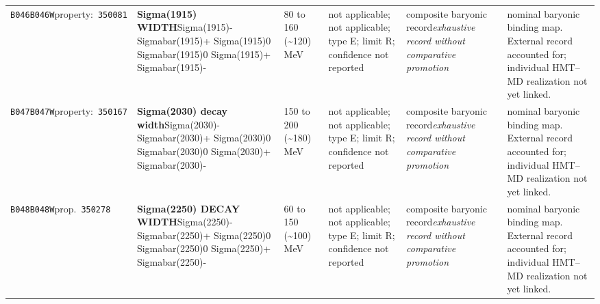 \begin{landscape}
\begin{longtable}{L{1.85cm}L{4.45cm}L{2.35cm}L{4.05cm}L{3.35cm}L{7.15cm}}
\texttt{B046}\newline \texttt{B046W}\newline property:\ \texttt{350081} & \textbf{Sigma(1915) WIDTH}\newline Sigma(1915)- \textbar{}\allowbreak{} Sigmabar(1915)+ \textbar{}\allowbreak{} Sigma(1915)0 \textbar{}\allowbreak{} Sigmabar(1915)0 \textbar{}\allowbreak{} Sigma(1915)+ \textbar{}\allowbreak{} Sigmabar(1915)- & 80 to 160 (\textasciitilde{}120)\,MeV & not applicable; not applicable; type E; limit R; confidence not reported & composite baryonic record\newline \emph{exhaustive record without comparative promotion} & nominal baryonic binding map. External record accounted for; individual HMT--MD realization not yet linked. \\
\texttt{B047}\newline \texttt{B047W}\newline property:\ \texttt{350167} & \textbf{Sigma(2030) decay width}\newline Sigma(2030)- \textbar{}\allowbreak{} Sigmabar(2030)+ \textbar{}\allowbreak{} Sigma(2030)0 \textbar{}\allowbreak{} Sigmabar(2030)0 \textbar{}\allowbreak{} Sigma(2030)+ \textbar{}\allowbreak{} Sigmabar(2030)- & 150 to 200 (\textasciitilde{}180)\,MeV & not applicable; not applicable; type E; limit R; confidence not reported & composite baryonic record\newline \emph{exhaustive record without comparative promotion} & nominal baryonic binding map. External record accounted for; individual HMT--MD realization not yet linked. \\
\texttt{B048}\newline \texttt{B048W}\newline prop.\ \texttt{350278} & \textbf{Sigma(2250) DECAY WIDTH}\newline Sigma(2250)- \textbar{}\allowbreak{} Sigmabar(2250)+ \textbar{}\allowbreak{} Sigma(2250)0 \textbar{}\allowbreak{} Sigmabar(2250)0 \textbar{}\allowbreak{} Sigma(2250)+ \textbar{}\allowbreak{} Sigmabar(2250)- & 60 to 150 (\textasciitilde{}100)\,MeV & not applicable; not applicable; type E; limit R; confidence not reported & composite baryonic record\newline \emph{exhaustive record without comparative promotion} & nominal baryonic binding map. External record accounted for; individual HMT--MD realization not yet linked. \\

\end{longtable}
\end{landscape}
